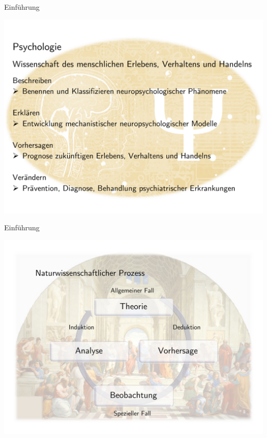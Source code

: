 \documentclass[
  8pt,
  ignorenonframetext,
]{beamer}
\begin{document}
\begin{frame}{Einführung}
\protect\hypertarget{einfuxfchrung}{}
\begin{center}\includegraphics[width=1\linewidth]{2_Abbildungen/pfm_2_psychologie} \end{center}
\end{frame}

\begin{frame}{Einführung}
\protect\hypertarget{einfuxfchrung-1}{}
\begin{center}\includegraphics[width=1\linewidth]{2_Abbildungen/pfm_2_wissenschaft_prozess} \end{center}
\end{frame}
\end{document}
